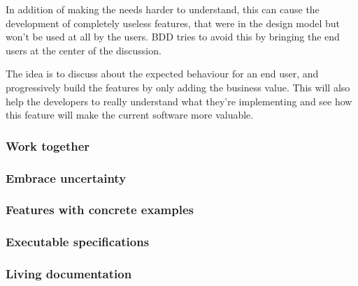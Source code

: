 In addition of making the needs harder to understand, this can cause the
development of completely useless features, that were in the design model but
won't be used at all by the users.
BDD tries to avoid this by bringing the end users at the center of the
discussion.

The idea is to discuss about the expected behaviour for an end user, and
progressively build the features by only adding the business value.
This will also help the developers to really understand what they're
implementing and see how this feature will make the current software more
valuable.

\subsubsection{Work together}

\subsubsection{Embrace uncertainty}

\subsubsection{Features with concrete examples}

\subsubsection{Executable specifications}

\subsubsection{Living documentation}

